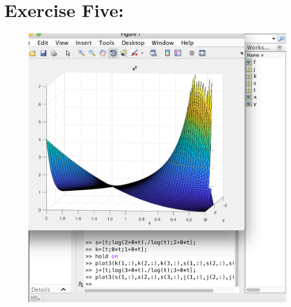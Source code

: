 \documentclass[11pt]{article}
\begin{document}
\section*{Exercise Five:}
\begin{figure}[H]
	\centering
	\includegraphics[width=\textwidth]{PartFive}
\end{figure}
\end{document}
